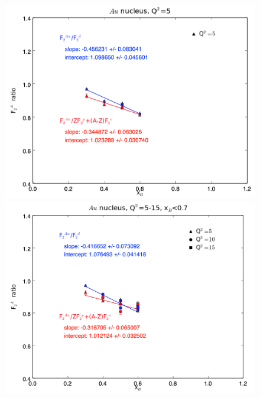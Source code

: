 \documentclass[oneside]{article}
\begin{document}
 \begin{figure}
\begin{minipage}{0.5\textwidth}
 \includegraphics[width=\textwidth]{plots/q2_5/q2_5_Au.png}
\end{minipage}\hfill\begin{minipage}{0.5\textwidth}
\includegraphics[width=\textwidth]{plots/q2_all_x_l7/q2_all_x_l7_Au.png}
\end{minipage}\hfill\begin{minipage}{0.5\textwidth}

\end{minipage}
\end{figure}
\end{document}
